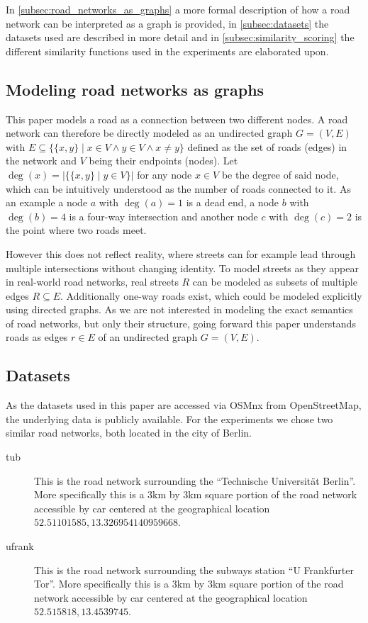 \documentclass[12pt,a4paper]{IEEEtran}
\begin{document}
In \autoref{subsec:road_networks_as_graphs} a more formal description
of how a road network can be interpreted as a graph is provided,
in \autoref{subsec:datasets} the datasets used are described in more detail and
in \autoref{subsec:similarity_scoring} the different similarity functions
used in the experiments are elaborated upon.

\subsection{Modeling road networks as graphs}\label{subsec:road_networks_as_graphs}

This paper models a road as a connection between two different nodes.
A road network can therefore be directly modeled as an undirected graph \(G = (V, E)\) with
\(E \subseteq \{\{x, y\} \mid x \in V \wedge y \in V \wedge x \neq y\}\) defined as the set of roads (edges) in the network
and \(V\) being their endpoints (nodes).
Let \(\deg(x) = |\{\{x, y\} \mid y \in V\}|\) for any node \(x \in V\) be the degree of said node,
which can be intuitively understood as the number of roads connected to it.
As an example a node \(a\) with \(\deg(a) = 1\) is a dead end,
a node \(b\) with \(\deg(b) = 4\) is a four-way intersection and
another node \(c\) with \(\deg(c) = 2\) is the point where two roads meet.

However this does not reflect reality, where streets can for example lead through
multiple intersections without changing identity.
To model streets as they appear in real-world road networks,
real streets \(R\) can be modeled as subsets of multiple edges \(R \subseteq E\).
Additionally one-way roads exist, which could be modeled explicitly using directed graphs.
As we are not interested in modeling the exact semantics of road networks,
but only their structure, going forward this paper understands roads as
edges \(r \in E\) of an undirected graph \(G = (V, E)\).

\subsection{Datasets}\label{subsec:datasets}

As the datasets used in this paper are accessed via OSMnx from OpenStreetMap,
the underlying data is publicly available.
For the experiments we chose two similar road networks,
both located in the city of Berlin.

\begin{description}
\item[tub] This is the road network surrounding the
      \enquote{\foreignlanguage{ngerman}{Technische Universität Berlin}}.
      More specifically this is a 3km by 3km square portion of the road network accessible
      by car centered at the geographical location \(52.51101585, 13.326954140959668\).
\item[ufrank] This is the road network surrounding the subways station
      \enquote{\foreignlanguage{ngerman}{U Frankfurter Tor}}.
      More specifically this is a 3km by 3km square portion of the road network accessible
      by car centered at the geographical location \(52.515818, 13.4539745\).
\end{description}
\end{document}
